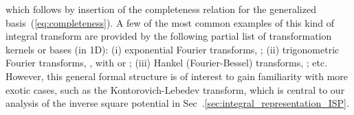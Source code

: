 \documentclass[a4paper,preprint,draft,showpacs,amsmath,amsfonts,amssymb,aps,prd]{revtex4}%
\begin{document}
which follows by 
insertion of the completeness relation for the generalized basis~(\ref{eq:completeness}).
A few of the most common examples of this
kind of integral transform are provided by the following partial list 
of transformation kernels or bases (in 1D):
(i) exponential Fourier transforms, \coordHE{};
(ii) trigonometric Fourier transforms, \coordHE{},
with \myHighlight{$\tau = \sin$}\coordHE{} or \myHighlight{$\tau = \cos$}\coordHE{};
(iii)
Hankel (Fourier-Bessel) transforms,
\coordHE{}; etc.
However, this general formal structure is of interest
to gain familiarity with more exotic cases, such as the
Kontorovich-Lebedev transform, which
 is central to our analysis of the inverse square potential in 
Sec~.\ref{sec:integral_representation_ISP}.
\end{document}
